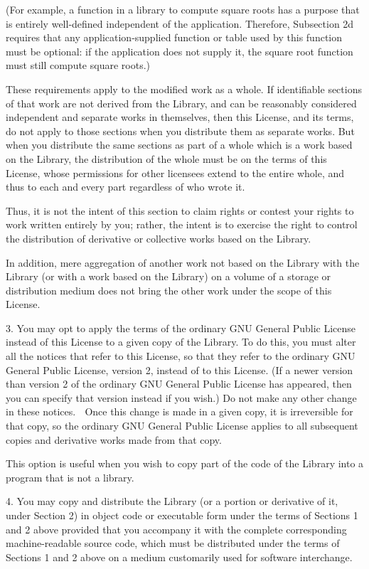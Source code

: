\documentclass[a4paper,twoside,12pt]{book}
\begin{document}
    (For example, a function in a library to compute square roots has
    a purpose that is entirely well-defined independent of the
    application.  Therefore, Subsection 2d requires that any
    application-supplied function or table used by this function must
    be optional: if the application does not supply it, the square
    root function must still compute square roots.)

These requirements apply to the modified work as a whole.  If
identifiable sections of that work are not derived from the Library,
and can be reasonably considered independent and separate works in
themselves, then this License, and its terms, do not apply to those
sections when you distribute them as separate works.  But when you
distribute the same sections as part of a whole which is a work based
on the Library, the distribution of the whole must be on the terms of
this License, whose permissions for other licensees extend to the
entire whole, and thus to each and every part regardless of who wrote
it.

Thus, it is not the intent of this section to claim rights or contest
your rights to work written entirely by you; rather, the intent is to
exercise the right to control the distribution of derivative or
collective works based on the Library.

In addition, mere aggregation of another work not based on the Library
with the Library (or with a work based on the Library) on a volume of
a storage or distribution medium does not bring the other work under
the scope of this License.

  3. You may opt to apply the terms of the ordinary GNU General Public
License instead of this License to a given copy of the Library.  To do
this, you must alter all the notices that refer to this License, so
that they refer to the ordinary GNU General Public License, version 2,
instead of to this License.  (If a newer version than version 2 of the
ordinary GNU General Public License has appeared, then you can specify
that version instead if you wish.)  Do not make any other change in
these notices.

  Once this change is made in a given copy, it is irreversible for
that copy, so the ordinary GNU General Public License applies to all
subsequent copies and derivative works made from that copy.

  This option is useful when you wish to copy part of the code of
the Library into a program that is not a library.

  4. You may copy and distribute the Library (or a portion or
derivative of it, under Section 2) in object code or executable form
under the terms of Sections 1 and 2 above provided that you accompany
it with the complete corresponding machine-readable source code, which
must be distributed under the terms of Sections 1 and 2 above on a
medium customarily used for software interchange.
\end{document}
